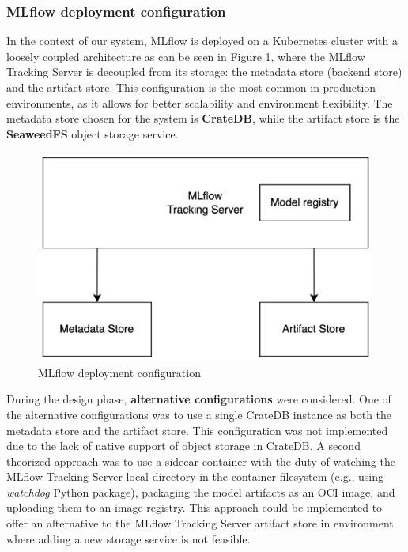 
\subsubsection{MLflow deployment configuration}

In the context of our system, MLflow is deployed on a Kubernetes cluster with a loosely coupled architecture as can be seen in Figure \ref{fig:mlflow_config}, where the MLflow Tracking Server is decoupled from its storage: the metadata store (backend store) and the artifact store.
This configuration is the most common in production environments, as it allows for better scalability and environment flexibility.
The metadata store chosen for the system is \textbf{CrateDB}, while the artifact store is the \textbf{SeaweedFS} object storage service. \\

\begin{figure}[htb]
  \centering
  \includegraphics[width=0.50\linewidth]{images/mlflow_config.png}
  \caption{MLflow deployment configuration}
  \label{fig:mlflow_config}
\end{figure}

During the design phase, \textbf{alternative configurations} were considered.
One of the alternative configurations was to use a single CrateDB instance as both the metadata store and the artifact store. This configuration was not implemented due to the lack of native support of object storage in CrateDB.
A second theorized approach was to use a sidecar container with the duty of watching the MLflow Tracking Server local directory in the container filesystem (e.g., using \textit{watchdog} Python package), packaging the model artifacts as an OCI image, and uploading them to an image registry. This approach could be implemented to offer an alternative to the MLflow Tracking Server artifact store in environment where adding a new storage service is not feasible.

